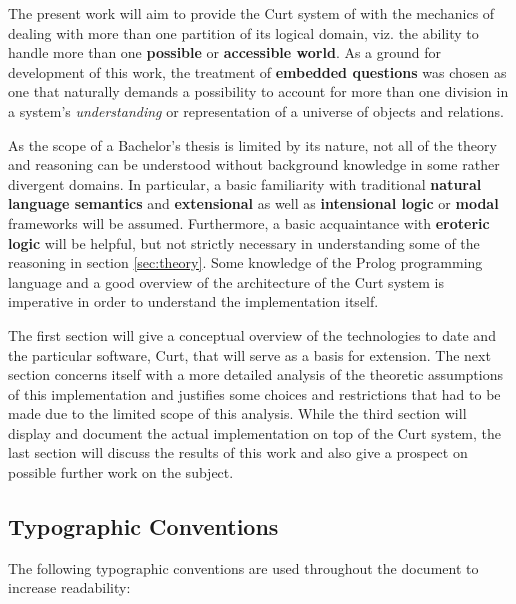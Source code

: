 \documentclass[a4paper]{article}
\newcommand{\term}[1]{\textsf{\textbf{#1}}} %
\newcommand{\pn}{\textsf} %
\newcommand{\curt}{\pn{Curt}}
\newcommand{\prol}{\pn{Prolog}}
\theoremstyle{remark}
\theoremstyle{remark}
\theoremstyle{definition}
\theoremstyle{definition}
\begin{document}
The present work will aim to provide the \curt{} system of
\cite{blackburnbos:cl1} with the mechanics of dealing with more than one
partition of its logical domain, viz. the ability to handle more than one
\term{possible} or \term{accessible world}. As a ground for development of this
work, the treatment of \term{embedded questions} was chosen as one that
naturally demands a possibility to account for more than one division in a
system's \emph{understanding} or representation of a universe of objects and
relations.

As the scope of a Bachelor's thesis is limited by its nature, not all of the
theory and reasoning can be understood without background knowledge in some
rather divergent domains. In particular, a basic familiarity with traditional
\term{natural language semantics} and \term{extensional} as well as
\term{intensional logic} or \term{modal} frameworks will be assumed.
Furthermore, a basic acquaintance with \term{eroteric logic} will be helpful,
but not strictly necessary in understanding some of the reasoning in section
\ref{sec:theory}.  Some knowledge of the \prol{} programming language and a good
overview of the architecture of the \curt{} system is imperative in order to
understand the implementation itself.

The first section will give a conceptual overview of the technologies to date
and the particular software, \curt, that will serve as a basis for extension.
The next section concerns itself with a more detailed analysis of the theoretic
assumptions of this implementation and justifies some choices and restrictions
that had to be made due to the limited scope of this analysis. While the
third section will display and document the actual implementation on top of the
\curt{} system, the last section will discuss the results of this work and also
give a prospect on possible further work on the subject.

\subsection{Typographic Conventions}

The following typographic conventions are used throughout the document to
increase readability:
\end{document}
